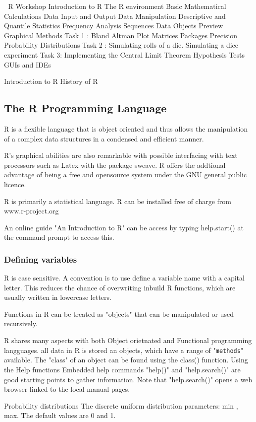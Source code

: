 

R Workshop
Introduction to R
The R environment
Basic Mathematical Calculations
Data Input and Output
Data Manipulation
Descriptive and Quantile Statistics
Frequency Analysis
Sequences
Data Objects
Preview
Graphical Methods
Task 1 : Bland Altman Plot
Matrices
Packages
Precision
Probability Distributions
Task 2 : Simulating rolls of a die.
Simulating a dice experiment
Task 3: Implementing the Central Limit Theorem
Hypothesis Tests
GUIs and  IDEs
 
 
  Introduction to R
History of R

\subsection{The R Programming Language}
R is a flexible language that is object oriented and thus allows the manipulation of a complex
data structures in a condensed and efficient manner.
 
R's graphical abilities are also remarkable with possible interfacing with text processors such as
Latex with the package sweave.
R offers the addtional advantage of being a free and opensource system under the GNU general
public licence.

R is primarily a statistical language.
R can be installed free of charge from www.r-project.org

An online guide "An Introduction to R" can be access by typing
help.start() at the command prompt to access this.

\subsubsection{Defining variables}
R is case sensitive.
A convention is to use define a variable name with a capital letter.
This reduces the chance of overwriting inbuild R functions, which are usually written in lowercase letters.


Functions in R can be treated as "objects" that can be manipulated or used recursively.

R shares many aspects with both Object orietnated and Functional programming langguages.
all data in R is stored an objects, which have a range of "\texttt{methods}" available.
The "class" of an object can be found using the class() function.
Using the Help functions
Embedded help commands "help()" and "help.search()" are good starting points to gather information. 
Note that "help.search()" opens a web browser linked to the local manual pages.
 
 
Probability distributions
The discrete uniform distribution
parameters: min , max.
The default values are 0 and 1.
 

